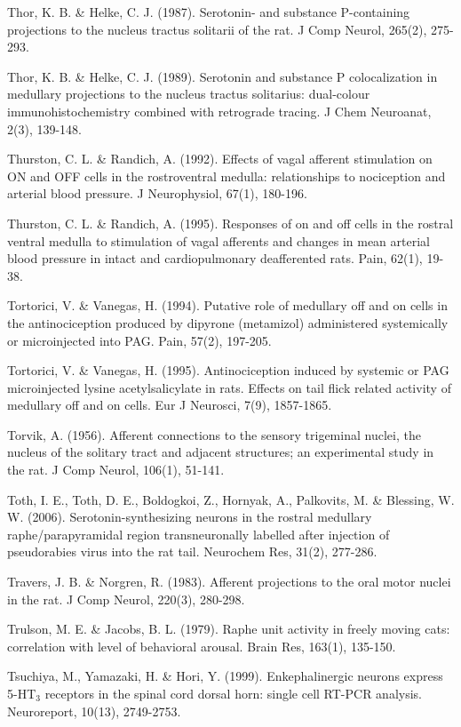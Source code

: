 \documentclass[a4paper,12pt,twoside]{report}
\begin{document}
\begin{singlespacing}
\begin{footnotesize}
Thor, K. B. \& Helke, C. J. (1987). Serotonin- and substance P-containing projections to the nucleus tractus solitarii of the rat. J Comp Neurol, 265(2), 275-293.

Thor, K. B. \& Helke, C. J. (1989). Serotonin and substance P colocalization in medullary projections to the nucleus tractus solitarius: dual-colour immunohistochemistry combined with retrograde tracing. J Chem Neuroanat, 2(3), 139-148.

Thurston, C. L. \& Randich, A. (1992). Effects of vagal afferent stimulation on ON and OFF cells in the rostroventral medulla: relationships to nociception and arterial blood pressure. J Neurophysiol, 67(1), 180-196.

Thurston, C. L. \& Randich, A. (1995). Responses of on and off cells in the rostral ventral medulla to stimulation of vagal afferents and changes in mean arterial blood pressure in intact and cardiopulmonary deafferented rats. Pain, 62(1), 19-38.

Tortorici, V. \& Vanegas, H. (1994). Putative role of medullary off and on cells in the antinociception produced by dipyrone (metamizol) administered systemically or microinjected into PAG. Pain, 57(2), 197-205.

Tortorici, V. \& Vanegas, H. (1995). Antinociception induced by systemic or PAG microinjected lysine acetylsalicylate in rats. Effects on tail flick related activity of medullary off and on cells. Eur J Neurosci, 7(9), 1857-1865.

Torvik, A. (1956). Afferent connections to the sensory trigeminal nuclei, the nucleus of the solitary tract and adjacent structures; an experimental study in the rat. J Comp Neurol, 106(1), 51-141.

Toth, I. E., Toth, D. E., Boldogkoi, Z., Hornyak, A., Palkovits, M. \& Blessing, W. W. (2006). Serotonin-synthesizing neurons in the rostral medullary raphe/parapyramidal region transneuronally labelled after injection of pseudorabies virus into the rat tail. Neurochem Res, 31(2), 277-286.

Travers, J. B. \& Norgren, R. (1983). Afferent projections to the oral motor nuclei in the rat. J Comp Neurol, 220(3), 280-298.

Trulson, M. E. \& Jacobs, B. L. (1979). Raphe unit activity in freely moving cats: correlation with level of behavioral arousal. Brain Res, 163(1), 135-150.

Tsuchiya, M., Yamazaki, H. \& Hori, Y. (1999). Enkephalinergic neurons express 5-HT$_{3}$ receptors in the spinal cord dorsal horn: single cell RT-PCR analysis. Neuroreport, 10(13), 2749-2753.


\end{footnotesize}
\end{singlespacing}
\end{document}
